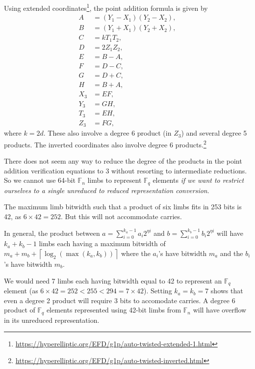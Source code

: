 \documentclass[a4paper, 12pt]{article}
\begin{document}
Using extended coordinates\footnote{\url{https://hyperelliptic.org/EFD/g1p/auto-twisted-extended-1.html}}, the point addition formula is given by
\begin{align*}
  A & = (Y_1-X_1)(Y_2-X_2),\\
  B & = (Y_1+X_1)(Y_2+X_2),\\
  C & = kT_1T_2,\\
  D & = 2Z_1Z_2,\\
  E & = B-A,\\
  F & = D-C,\\
  G & = D+C,\\
  H & = B+A,\\
  X_3 & = EF,\\
  Y_3 & = GH,\\
  T_3 & = EH,\\
  Z_3 & = FG,
\end{align*}
where $k=2d$. These also involve a degree 6 product (in $Z_3$) and several degree 5 products. The inverted coordinates also involve degree 6 products.\footnote{\url{https://hyperelliptic.org/EFD/g1p/auto-twisted-inverted.html}}

There does not seem any way to reduce the degree of the products in the point addition verification equations to 3 without resorting to intermediate reductions. So we cannot use 64-bit $\mathbb{F}_n$ limbs to represent $\mathbb{F}_q$ elements \textit{if we want to restrict ourselves to a single unreduced to reduced representation conversion}.

The maximum limb bitwidth such that a product of six limbs fits in 253 bits is 42, as $6\times 42 = 252$. But this will not accommodate carries.

In general, the product between $a = \sum_{i=0}^{k_a-1}a_i 2^{\eta i}$ and $b= \sum_{i=0}^{k_b-1}b_i 2^{\eta i}$ will have $k_a+k_b-1$ limbs each having a maximum bitwidth of $m_a+m_b+\left\lceil \log_2 \left( \max\left( k_a, k_b \right) \right) \right\rceil$ where the $a_i$'s have bitwidth $m_a$ and the $b_i$'s have bitwidth $m_b$.

We would need 7 limbs each having bitwidth equal to 42 to represent an $\mathbb{F}_q$ element (as $6\times 42 = 252 < 255 < 294 = 7\times 42$). Setting $k_a=k_b =7$ shows that even a degree 2 product will require 3 bits to accomodate carries. A degree 6 product of $\mathbb{F}_q$ elements represented using 42-bit limbs from $\mathbb{F}_n$ will have overflow in its unreduced representation.
\end{document}
